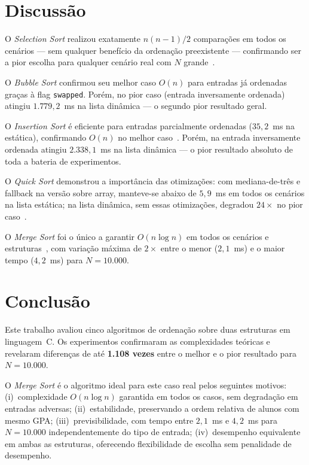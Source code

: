 \documentclass[conference]{IEEEtran}
\begin{document}
\section{Discussão}
\label{sec:disc}

O \textit{Selection Sort} realizou exatamente $n(n-1)/2$ comparações em
todos os cenários --- sem qualquer benefício da ordenação preexistente ---
confirmando ser a pior escolha para qualquer cenário real com $N$
grande~\cite{knuth1998}.

O \textit{Bubble Sort} confirmou seu melhor caso $O(n)$ para entradas
já ordenadas graças à flag \texttt{swapped}. Porém, no pior caso (entrada
inversamente ordenada) atingiu $1{.}779{,}2$~ms na lista dinâmica ---
o segundo pior resultado geral.

O \textit{Insertion Sort} é eficiente para entradas parcialmente ordenadas
($35{,}2$~ms na estática), confirmando $O(n)$ no melhor caso~\cite{wirth1976}.
Porém, na entrada inversamente ordenada atingiu $2{.}338{,}1$~ms na lista
dinâmica --- o pior resultado absoluto de toda a bateria de experimentos.

O \textit{Quick Sort} demonstrou a importância das otimizações: com
mediana-de-três e fallback na versão sobre array, manteve-se abaixo de
$5{,}9$~ms em todos os cenários na lista estática; na lista dinâmica,
sem essas otimizações, degradou $24\times$ no pior caso~\cite{sedgewick2011}.

O \textit{Merge Sort} foi o único a garantir $O(n \log n)$ em todos os
cenários e estruturas~\cite{cormen2022}, com variação máxima de $2\times$
entre o menor ($2{,}1$~ms) e o maior tempo ($4{,}2$~ms) para
$N = 10{.}000$.

\section{Conclusão}
\label{sec:conc}

Este trabalho avaliou cinco algoritmos de ordenação sobre duas estruturas
em linguagem~C. Os experimentos confirmaram as complexidades teóricas e
revelaram diferenças de até \textbf{1.108 vezes} entre o melhor e o pior
resultado para $N = 10{.}000$.

O \textit{Merge Sort} é o algoritmo ideal para este caso real pelos
seguintes motivos:
(i)~complexidade $O(n \log n)$ garantida em todos os casos, sem degradação
em entradas adversas;
(ii)~estabilidade, preservando a ordem relativa de alunos com mesmo GPA;
(iii)~previsibilidade, com tempo entre $2{,}1$~ms e $4{,}2$~ms para
$N = 10{.}000$ independentemente do tipo de entrada;
(iv)~desempenho equivalente em ambas as estruturas, oferecendo flexibilidade
de escolha sem penalidade de desempenho.
\end{document}
